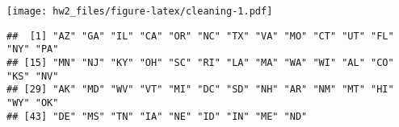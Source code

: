 \documentclass[]{article}
\newenvironment{Shaded}{\begin{snugshade}}{\end{snugshade}}
\newcommand{\KeywordTok}[1]{\textcolor[rgb]{0.13,0.29,0.53}{\textbf{#1}}}
\newcommand{\OperatorTok}[1]{\textcolor[rgb]{0.81,0.36,0.00}{\textbf{#1}}}
\newcommand{\NormalTok}[1]{#1}
\begin{document}
\texttt{[image: hw2\_files/figure-latex/cleaning-1.pdf]}

\begin{Shaded}
\end{Shaded}

\begin{verbatim}
##  [1] "AZ" "GA" "IL" "CA" "OR" "NC" "TX" "VA" "MO" "CT" "UT" "FL" "NY" "PA"
## [15] "MN" "NJ" "KY" "OH" "SC" "RI" "LA" "MA" "WA" "WI" "AL" "CO" "KS" "NV"
## [29] "AK" "MD" "WV" "VT" "MI" "DC" "SD" "NH" "AR" "NM" "MT" "HI" "WY" "OK"
## [43] "DE" "MS" "TN" "IA" "NE" "ID" "IN" "ME" "ND"
\end{verbatim}
\end{document}

